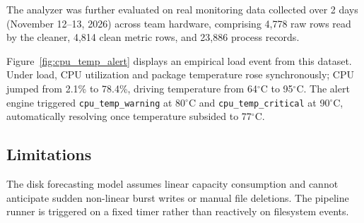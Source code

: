 The analyzer was further evaluated on real monitoring data collected over 2 days (November 12--13, 2026) across team hardware, comprising 4,778 raw rows read by the cleaner, 4,814 clean metric rows, and 23,886 process records.

Figure~\ref{fig:cpu_temp_alert} displays an empirical load event from this dataset. Under load, CPU utilization and package temperature rose synchronously; CPU jumped from 2.1\% to 78.4\%, driving temperature from 64$^\circ$C to 95$^\circ$C. The alert engine triggered \texttt{cpu\_temp\_warning} at 80$^\circ$C and \texttt{cpu\_temp\_critical} at 90$^\circ$C, automatically resolving once temperature subsided to 77$^\circ$C.

\subsection{Limitations}
The disk forecasting model assumes linear capacity consumption and cannot anticipate sudden non-linear burst writes or manual file deletions. The pipeline runner is triggered on a fixed timer rather than reactively on filesystem events.
